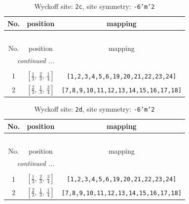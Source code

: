 \documentclass[fleqn,8pt]{jsarticle}
\begin{document}
\renewcommand{\arraystretch}{1.2}
\begin{longtable}{ccc}
\caption{Wyckoff site: {\tt 2c}, site symmetry: {\tt -6'm'2}}
 \\
 \hline \hline
No. & position & mapping \\ \hline \endfirsthead

\multicolumn{2}{l}{\tablename\ \thetable{}} \\
 \hline \hline
No. & position & mapping \\ \hline \endhead

 \hline \hline
\multicolumn{2}{r}{\footnotesize\it continued ...} \\ \endfoot

 \hline \hline
\multicolumn{2}{r}{} \\ \endlastfoot

1 & $\left[ \frac{1}{3},\, \frac{2}{3},\, \frac{1}{4} \right]$ & {\tt [1,2,3,4,5,6,19,20,21,22,23,24]} \\ \hline
2 & $\left[ \frac{2}{3},\, \frac{1}{3},\, \frac{3}{4} \right]$ & {\tt [7,8,9,10,11,12,13,14,15,16,17,18]} \\
\end{longtable}
\renewcommand{\arraystretch}{1.2}
\begin{longtable}{ccc}
\caption{Wyckoff site: {\tt 2d}, site symmetry: {\tt -6'm'2}}
 \\
 \hline \hline
No. & position & mapping \\ \hline \endfirsthead

\multicolumn{2}{l}{\tablename\ \thetable{}} \\
 \hline \hline
No. & position & mapping \\ \hline \endhead

 \hline \hline
\multicolumn{2}{r}{\footnotesize\it continued ...} \\ \endfoot

 \hline \hline
\multicolumn{2}{r}{} \\ \endlastfoot

1 & $\left[ \frac{1}{3},\, \frac{2}{3},\, \frac{3}{4} \right]$ & {\tt [1,2,3,4,5,6,19,20,21,22,23,24]} \\ \hline
2 & $\left[ \frac{2}{3},\, \frac{1}{3},\, \frac{1}{4} \right]$ & {\tt [7,8,9,10,11,12,13,14,15,16,17,18]} \\
\end{longtable}
\renewcommand{\arraystretch}{1.2}
\end{document}
